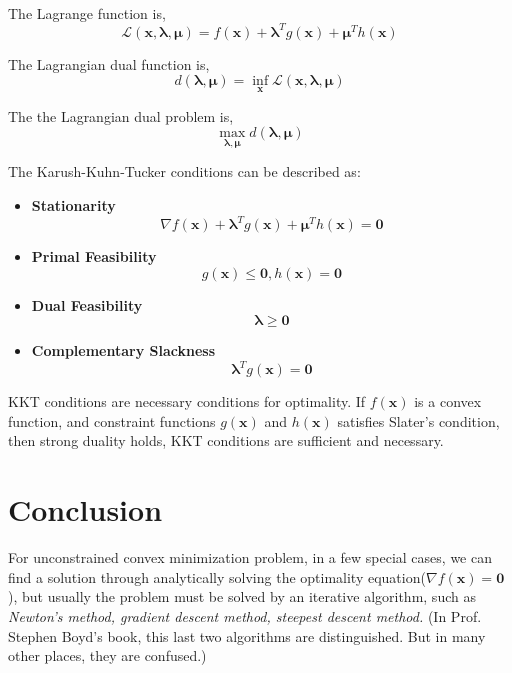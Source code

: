 \documentclass{article}
\begin{document}
\

The Lagrange function is,
\begin{equation}
	\mathcal{L}(\bm{x}, \bm{\lambda}, \bm{\mu}) = f(\bm{x}) + \bm{\lambda}^T g(\bm{x}) + \bm{\mu}^Th(\bm{x}) 
\end{equation}

The Lagrangian dual function is,
\begin{equation}
	d(\bm{\lambda}, \bm{\mu}) = \inf_{\bm{x}} \mathcal{L}(\bm{x}, \bm{\lambda}, \bm{\mu})
\end{equation}

The the Lagrangian dual problem is,
\begin{equation}
	\max_{\bm{\lambda}, \bm{\mu}} d(\bm{\lambda}, \bm{\mu})
\end{equation}

The Karush-Kuhn-Tucker conditions can be described as:

\begin{itemize}
	\item \textbf{Stationarity}
	\begin{equation}
		\nabla f(\bm{x}) + \bm{\lambda}^Tg(\bm{x}) + \bm{\mu}^T h(\bm{x}) = \bm{0}
	\end{equation}
	\item \textbf{Primal Feasibility}
	\begin{equation}
		g(\bm{x}) \leq \bm{0}, 		h(\bm{x}) = \bm{0}
	\end{equation}
	\item \textbf{Dual Feasibility}
	\begin{equation}
		\bm{\lambda} \geq \bm{0}
	\end{equation}
	\item \textbf{Complementary Slackness}
	\begin{equation}
		\bm{\lambda}^T g(\bm{x}) = \bm{0}
	\end{equation}
\end{itemize}

KKT conditions are necessary conditions for optimality. If $f(\bm{x})$ is a convex function, and constraint functions $g(\bm{x})$ and $h(\bm{x})$ satisfies Slater's condition, then strong duality holds, KKT conditions are sufficient and necessary.

\section{Conclusion}

For unconstrained convex minimization problem, in a few special cases, we can find a solution through analytically solving the optimality equation($\nabla f(\bm{x}) = \bm{0}$), but usually the problem must be solved by an iterative algorithm, such as \textit{Newton's method, gradient descent method, steepest descent method.} (In Prof. Stephen Boyd's book, this last two algorithms are distinguished.  But in many other places, they are confused.) 
\end{document}
